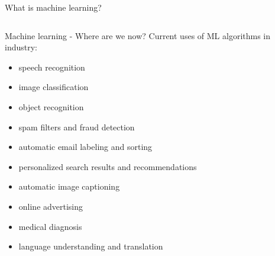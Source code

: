 \documentclass[10pt]{beamer}
\begin{document}
\begin{frame}{What is machine learning?}
\begin{columns}
	\end{columns}
\end{frame}

\begin{frame}{Machine learning - Where are we now?}
	Current uses of ML algorithms in industry:
	\begin{itemize}
		\item<2-> speech recognition
		\item<3-> image classification
		\item<4-> object recognition
		\item<5-> spam filters and fraud detection
		\item<6-> automatic email labeling and sorting
		\item<7-> personalized search results and recommendations
		\item<8-> automatic image captioning
		\item<9-> online advertising
		\item<10-> medical diagnosis
		\item<11-> language understanding and translation
	\end{itemize}
\end{frame}
\end{document}
